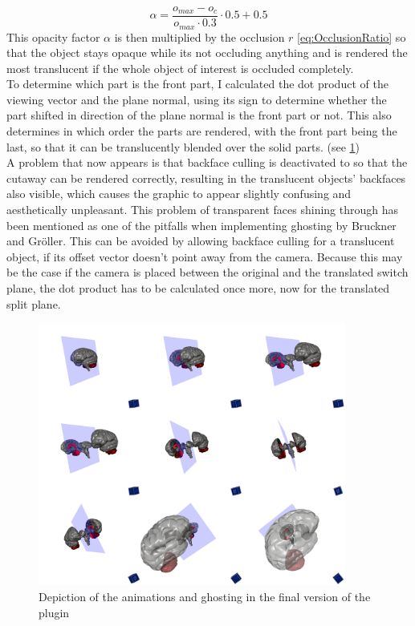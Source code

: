 \begin{equation}
	\alpha = \frac{o_{max}-o_c}{o_{max} \cdot 0.3} \cdot 0.5 + 0.5
\end{equation}
This opacity factor $\alpha$ is then multiplied by the occlusion $r$ \ref{eq:OcclusionRatio}  so that the object stays opaque while its not occluding anything and is rendered the most translucent if the whole object of interest is occluded completely.\\
To determine which part is the front part, I calculated the dot product of the viewing vector and the plane normal, using its sign to determine whether the part shifted in direction of the plane normal is the front part or not. This also determines in which order the parts are rendered, with the front part being the last, so that it can be translucently blended over the solid parts. (see \ref{fig:brainstem})\\
A problem that now appears is that backface culling is deactivated to so that the cutaway can be rendered correctly, resulting in the translucent objects' backfaces also visible, which causes the graphic to appear slightly confusing and aesthetically unpleasant. This problem of transparent faces shining through has been mentioned as one of the pitfalls when implementing ghosting by Bruckner and Gr\"oller\cite{proc:bruckner-2006-EVV}. This can be avoided by allowing backface culling for a translucent object, if its offset vector doesn't point away from the camera. Because this may be the case if the camera is placed between the original and the translated switch plane, the dot product has to be calculated once more, now for the translated split plane.\\
\begin{figure}[tb]
	\centering
	\includegraphics[width=0.9\textwidth]{chapters/figures/brainstem}
	\caption{Depiction of the animations and ghosting in the final version of the plugin}
	\label{fig:brainstem}
\end{figure}
